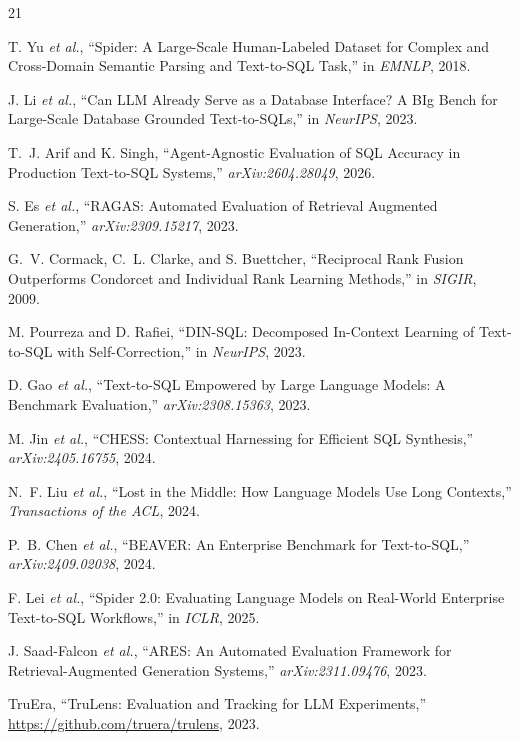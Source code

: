 \documentclass[conference]{IEEEtran}
\begin{document}
\begin{thebibliography}{21}

T. Yu \textit{et al.},
``Spider: A Large-Scale Human-Labeled Dataset for Complex and
Cross-Domain Semantic Parsing and Text-to-SQL Task,''
in \textit{EMNLP}, 2018.

J. Li \textit{et al.},
``Can LLM Already Serve as a Database Interface? A BIg Bench for
Large-Scale Database Grounded Text-to-SQLs,''
in \textit{NeurIPS}, 2023.

T.~J. Arif and K. Singh,
``Agent-Agnostic Evaluation of SQL Accuracy in Production Text-to-SQL Systems,''
\textit{arXiv:2604.28049}, 2026.

S. Es \textit{et al.},
``RAGAS: Automated Evaluation of Retrieval Augmented Generation,''
\textit{arXiv:2309.15217}, 2023.

G.~V. Cormack, C.~L. Clarke, and S. Buettcher,
``Reciprocal Rank Fusion Outperforms Condorcet and Individual Rank
Learning Methods,''
in \textit{SIGIR}, 2009.

M. Pourreza and D. Rafiei,
``DIN-SQL: Decomposed In-Context Learning of Text-to-SQL with
Self-Correction,''
in \textit{NeurIPS}, 2023.

D. Gao \textit{et al.},
``Text-to-SQL Empowered by Large Language Models: A Benchmark Evaluation,''
\textit{arXiv:2308.15363}, 2023.

M. Jin \textit{et al.},
``CHESS: Contextual Harnessing for Efficient SQL Synthesis,''
\textit{arXiv:2405.16755}, 2024.

N.~F. Liu \textit{et al.},
``Lost in the Middle: How Language Models Use Long Contexts,''
\textit{Transactions of the ACL}, 2024.

P.~B. Chen \textit{et al.},
``BEAVER: An Enterprise Benchmark for Text-to-SQL,''
\textit{arXiv:2409.02038}, 2024.

F. Lei \textit{et al.},
``Spider 2.0: Evaluating Language Models on Real-World Enterprise
Text-to-SQL Workflows,''
in \textit{ICLR}, 2025.

J. Saad-Falcon \textit{et al.},
``ARES: An Automated Evaluation Framework for Retrieval-Augmented
Generation Systems,''
\textit{arXiv:2311.09476}, 2023.

TruEra,
``TruLens: Evaluation and Tracking for LLM Experiments,''
\url{https://github.com/truera/trulens}, 2023.


\end{thebibliography}
\end{document}
